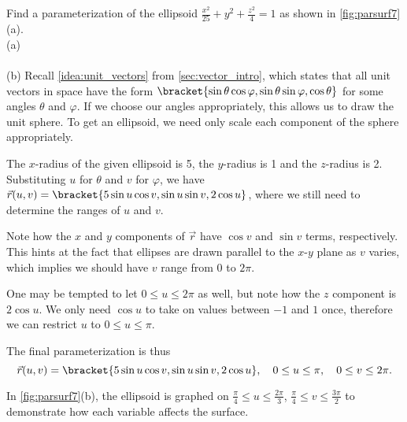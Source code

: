 \begin{example}\label{ex_parsurf7}
Find a parameterization of the ellipsoid $\frac{x^2}{25}+y^2+\frac{z^2}{4}=1$ as shown in \autoref{fig:parsurf7}(a).
%
{
\\(a)\\[10pt]
\\(b)}
%
\solution
Recall \autoref{idea:unit_vectors} from \autoref{sec:vector_intro}, which states that all unit vectors in space have the form $\bracket{\sin\theta\cos\varphi,\sin\theta\sin\varphi,\cos\theta}$ for some angles $\theta$ and $\varphi$. If we choose our angles appropriately, this allows us to draw the unit sphere. To get an ellipsoid, we need only scale each component of the sphere appropriately.

The $x$-radius of the given ellipsoid is 5, the $y$-radius is 1 and the $z$-radius is 2. Substituting $u$ for $\theta$ and $v$ for $\varphi$, we have $\vec r(u,v) =\bracket{5\sin u\cos v, \sin u\sin v,2\cos u}$, where we still need to determine the ranges of $u$ and $v$. 

Note how the $x$ and $y$ components of $\vec r$ have  $\cos v$ and $\sin v$ terms, respectively. This hints at the fact that ellipses are drawn parallel to the $x$-$y$ plane as $v$ varies, which implies we should have $v$ range from $0$ to $2\pi$. 

One may be tempted to let $0\leq u\leq 2\pi$ as well, but note how the $z$ component is $2\cos u$. We only need $\cos u$ to take on values between $-1$ and $1$ once, therefore we can restrict $u$ to $0\leq u\leq \pi$. 

The final parameterization is thus
\[
\vec r(u,v) =\bracket{5\sin u\cos v, \sin u\sin v,2\cos u},
\quad 0\leq u\leq\pi,\quad 0\leq v\leq 2\pi.
\]

In \autoref{fig:parsurf7}(b), the ellipsoid is graphed on $\frac{\pi}{4}\leq u\leq \frac{2\pi}{3}$, $\frac{\pi}4\leq v\leq \frac{3\pi}2$ to demonstrate how each variable affects the surface.
\end{example}


